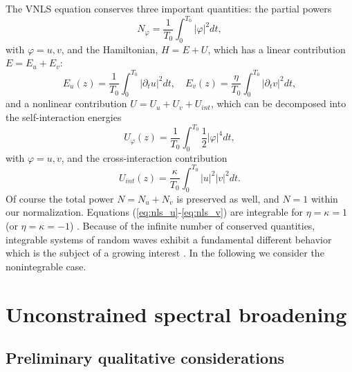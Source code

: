 \documentclass[pra,twocolumn,showpacs,preprintnumbers,amsmath,amssymb]{revtex4}
\def\vfi{\varphi}
\begin{document}
The VNLS equation conserves three important quantities: the partial powers 
\begin{equation}
N_\vfi=\frac{1}{T_0}\int_0^{T_0} |\vfi|^2 dt,\label{eq:power}
\end{equation}
with $\vfi=u,v$, and the Hamiltonian, ${H}={E}+{U}$, which has a linear contribution ${E} = {E}_u+{E}_v$:
\begin{equation}
{E}_u(z) = \frac{1}{T_0}\int_0^{T_0}  |\partial_t u|^2 dt, \quad {E}_v(z) = \frac{\eta}{T_0} \int_0^{T_0}  |\partial_t v|^2 dt, 
\label{eq:lin_energy}
\end{equation}
and a nonlinear contribution $U=U_u+U_v+U_{int}$, which can be decomposed into the self-interaction energies
\begin{equation}
U_\vfi(z) = \frac{1}{T_0} \int_0^{T_0} \frac{1}{2} |\vfi|^4 dt,
\label{eq:u_spm}
\end{equation}
with $\vfi=u,v$, and the cross-interaction contribution
\begin{equation}
U_{int}(z) =  \frac{\kappa}{T_0} \int_0^{T_0}  |u|^2|v|^2 dt.
\label{eq:u_xpm}
\end{equation}
Of course the total power $N=N_u+N_v$ is preserved as well, and $N=1$ within our normalization.
Equations (\ref{eq:nls_u}-\ref{eq:nls_v}) are integrable for $\eta=\kappa=1$ (or $\eta=\kappa=-1$) \cite{ZakhInteg}.
Because of the infinite number of conserved quantities, integrable systems of random waves exhibit a fundamental different behavior which is  the subject of a growing interest \cite{OE11,integ_prl,costa14,zakharov15,akhmediev15,
akhmediev16,int_pd,integ_sr}.
In the following we consider the nonintegrable case.




\section{Unconstrained spectral broadening}

\subsection{Preliminary qualitative considerations}
\end{document}
